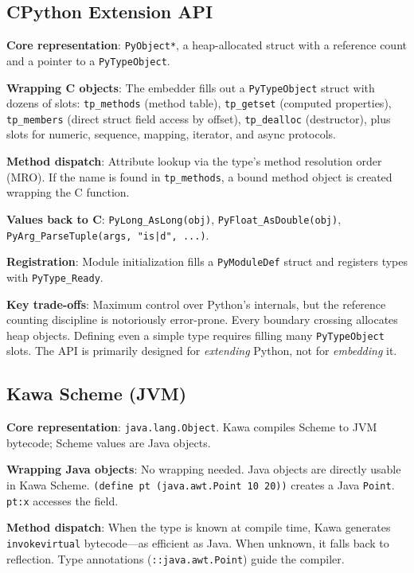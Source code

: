 \documentclass[11pt]{article}
\begin{document}
\subsection{CPython Extension API}
\label{sec:cpython}

\textbf{Core representation}: \texttt{PyObject*}, a heap-allocated
struct with a reference count and a pointer to a
\texttt{PyTypeObject}.

\textbf{Wrapping C objects}: The embedder fills out a
\texttt{PyTypeObject} struct with dozens of slots:
\texttt{tp\_methods} (method table), \texttt{tp\_getset} (computed
properties), \texttt{tp\_members} (direct struct field access by
offset), \texttt{tp\_dealloc} (destructor), plus slots for numeric,
sequence, mapping, iterator, and async protocols.

\textbf{Method dispatch}: Attribute lookup via the type's method
resolution order (MRO).  If the name is found in
\texttt{tp\_methods}, a bound method object is created wrapping the C
function.

\textbf{Values back to C}: \texttt{PyLong\_AsLong(obj)},
\texttt{PyFloat\_AsDouble(obj)},
\texttt{PyArg\_ParseTuple(args, "is|d", ...)}.

\textbf{Registration}: Module initialization fills a
\texttt{PyModuleDef} struct and registers types with
\texttt{PyType\_Ready}.

\textbf{Key trade-offs}: Maximum control over Python's internals, but
the reference counting discipline is notoriously error-prone.  Every
boundary crossing allocates heap objects.  Defining even a simple type
requires filling many \texttt{PyTypeObject} slots.  The API is
primarily designed for \emph{extending} Python, not for
\emph{embedding} it.


\subsection{Kawa Scheme (JVM)}
\label{sec:kawa}

\textbf{Core representation}: \texttt{java.lang.Object}.  Kawa
compiles Scheme to JVM bytecode; Scheme values are Java objects.

\textbf{Wrapping Java objects}: No wrapping needed.  Java objects are
directly usable in Kawa Scheme.
\texttt{(define pt (java.awt.Point 10 20))} creates a Java
\texttt{Point}.  \texttt{pt:x} accesses the field.

\textbf{Method dispatch}: When the type is known at compile time, Kawa
generates \texttt{invokevirtual} bytecode---as efficient as Java.
When unknown, it falls back to reflection.  Type annotations
(\texttt{::java.awt.Point}) guide the compiler.
\end{document}
